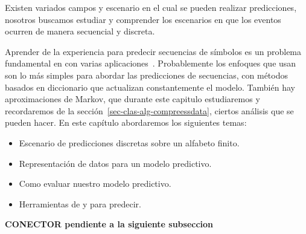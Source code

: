 Existen variados campos y escenario en el cual se pueden realizar predicciones, nosotros buscamos estudiar y comprender los escenarios en que los eventos ocurren de manera secuencial y discreta. 

Aprender de la experiencia para predecir secuencias de símbolos es un problema fundamental en \machinelearning con varias aplicaciones~\cite{Laird1994}. Probablemente los enfoques que usan \losslessdatacompression son lo más simples para abordar las predicciones de secuencias, con métodos basados en diccionario que actualizan constantemente el modelo. También hay aproximaciones de Markov, que durante este capitulo estudiaremos y recordaremos de la sección~\ref{sec-clas-alg-compreessdata}, ciertos análisis que se pueden hacer. En este capítulo abordaremos los siguientes temas:

\begin{itemize}
	\menorEspacioItemize
	\item Escenario de predicciones discretas sobre un alfabeto finito.
	\item Representación de datos para un modelo predictivo.
	\item Como evaluar nuestro modelo predictivo.
	\item Herramientas de \machinelearning y \losslessdatacompression para predecir.
\end{itemize}




\textbf{CONECTOR pendiente a la siguiente subseccion}